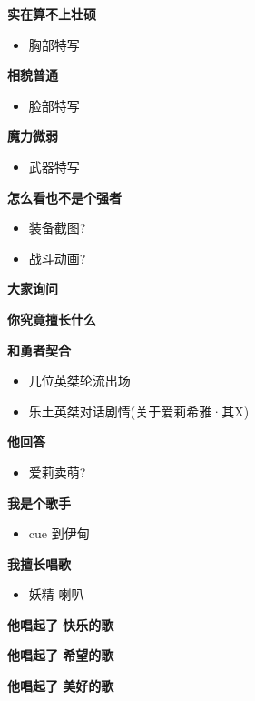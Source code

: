 \documentclass[a4paper]{article}
\begin{document}
\textbf{实在算不上壮硕}

\begin{itemize}
    \item 胸部特写
\end{itemize}

\textbf{相貌普通}

\begin{itemize}
    \item 脸部特写
\end{itemize}

\textbf{魔力微弱}

\begin{itemize}
    \item 武器特写
\end{itemize}

\textbf{怎么看也不是个强者}

\begin{itemize}
    \item 装备截图?
    \item 战斗动画?
\end{itemize}

\textbf{大家询问}

\textbf{你究竟擅长什么}

\textbf{和勇者契合}

\begin{itemize}
    \item 几位英桀轮流出场
    \item 乐土英桀对话剧情(关于爱莉希雅·其X)
\end{itemize}

\textbf{他回答}

\begin{itemize}
    \item 爱莉卖萌?
\end{itemize}

\textbf{我是个歌手}

\begin{itemize}
    \item cue 到伊甸
\end{itemize}

\textbf{我擅长唱歌}

\begin{itemize}
    \item 妖精 喇叭
\end{itemize}

\textbf{他唱起了 快乐的歌}

\textbf{他唱起了 希望的歌}

\textbf{他唱起了 美好的歌}
\end{document}
